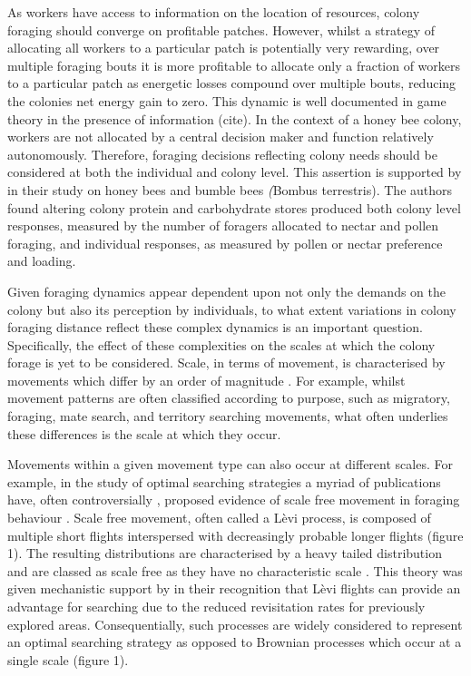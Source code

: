 \documentclass[11pt,usenames,dvipsnames]{article}
\begin{document}
As workers have access to information on the location of resources, colony foraging should converge on profitable patches. However, whilst a strategy of allocating all workers to a particular patch is potentially very rewarding, over multiple foraging bouts it is more profitable to allocate only a fraction of workers to a particular patch as energetic losses compound over multiple bouts, reducing the colonies net energy gain to zero. This dynamic is well documented in game theory in the presence of information (cite). In the context of a honey bee colony, workers are not allocated by a central decision maker and function relatively autonomously. Therefore, foraging decisions reflecting colony needs should be considered at both the individual and colony level. This assertion is supported by \cite{Hendriksma2019} in their study on honey bees and bumble bees \textit(Bombus terrestris). The authors found altering colony protein and carbohydrate stores produced both colony level responses, measured by the number of foragers allocated to nectar and pollen foraging, and individual responses, as measured by pollen or nectar preference and loading. 

Given foraging dynamics appear dependent upon not only the demands on the colony but also its perception by individuals, to what extent variations in colony foraging distance reflect these complex dynamics is an important question. Specifically, the effect of these complexities on the scales at which the colony forage is yet to be considered. Scale, in terms of movement, is characterised by movements which differ by an order of magnitude \citep{Levin1992}. For example, whilst movement patterns are often classified according to purpose, such as migratory, foraging, mate search, and territory searching movements, what often underlies these differences is the scale at which they occur. 

Movements within a given movement type can also occur at different scales. For example, in the study of optimal searching strategies a myriad of publications have, often controversially \citep{Viswanathan1996}, proposed evidence of scale free movement in foraging behaviour \citep{Harris2012, Ariel2015, Humphries2010, Baronchelli2013, Boyer, Ramos-Fernandez2004, Sims2008, Viswanathan1999}. Scale free movement, often called a L\`evi process, is composed of multiple short flights interspersed with decreasingly probable longer flights (figure 1). The resulting distributions are characterised by a heavy tailed distribution and are classed as scale free as they have no characteristic scale \citep{Reynolds2018}. This theory was given mechanistic support by \cite{Shlesinger1986} in their recognition that L\`evi flights can provide an advantage for searching due to the reduced revisitation rates for previously explored areas. Consequentially, such processes are widely considered to represent an optimal searching strategy \citep{Viswanathan1999,Humphries2014} as opposed to Brownian processes which occur at a single scale (figure 1). 
\end{document}
